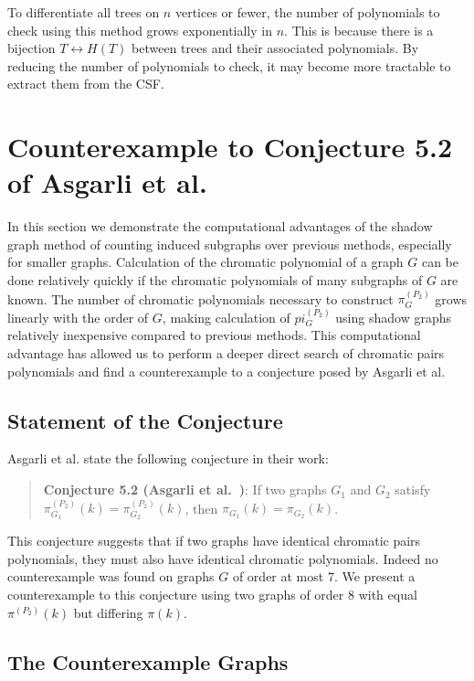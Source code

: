 \documentclass[12pt,reqno,dvipsnames]{amsart}
\theoremstyle{definition}
\begin{document}
To differentiate all trees on $n$ vertices or fewer, the number of polynomials to check using this method grows exponentially in $n$. This is because there is a bijection $T \leftrightarrow H(T)$ between trees and their associated polynomials. By reducing the number of polynomials to check, it may become more tractable to extract them from the CSF.

\section{Counterexample to Conjecture 5.2 of Asgarli et al.}\label{sec:counterexample}
In this section we demonstrate the computational advantages of the shadow graph method of counting induced subgraphs over previous methods, especially for smaller graphs. Calculation of the chromatic polynomial of a graph $G$ can be done relatively quickly if the chromatic polynomials of many subgraphs of $G$ are known. The number of chromatic polynomials necessary to construct $\pi^{(P_2)}_G$ grows linearly with the order of $G$, making calculation of $pi^{(P_2)}_G$ using shadow graphs relatively inexpensive compared to previous methods. This computational advantage has allowed us to perform a deeper direct search of chromatic pairs polynomials and find a counterexample to a conjecture posed by Asgarli et al.

\subsection{Statement of the Conjecture}

Asgarli et al. state the following conjecture in their work:

\begin{quote}
\textbf{Conjecture 5.2 (Asgarli et al.\ \cite{AKLR25})}: If two graphs $G_1$ and $G_2$ satisfy $\pi_{G_1}^{(P_2)}(k) = \pi_{G_2}^{(P_2)}(k)$, then $\pi_{G_1}(k) = \pi_{G_2}(k)$.
\end{quote}

This conjecture suggests that if two graphs have identical chromatic pairs polynomials, they must also have identical chromatic polynomials. Indeed no counterexample was found on graphs $G$ of order at most 7. We present a counterexample to this conjecture using two graphs of order 8 with equal $\pi^{(P_2)}(k)$ but differing $\pi(k)$.

\subsection{The Counterexample Graphs}
\end{document}

